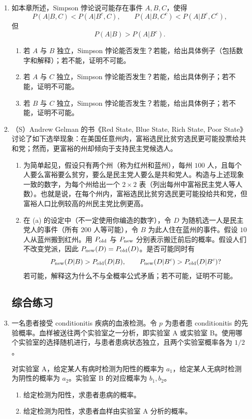 \documentclass[UTF8, 12pt, fontset=fandol, oneside]{ctexart}
\begin{document}
\begin{enumerate}
  \item 如本章所述，Simpson 悖论说可能存在事件 $A,B,C$，使得
  \[
    P(A|B,C)<P(A|B^c,C),\qquad
    P(A|B,C^c)<P(A|B^c,C^c),
  \]
  但
  \[
    P(A|B)>P(A|B^c).
  \]
  \begin{enumerate}
    \item 若 $A$ 与 $B$ 独立，Simpson 悖论能否发生？若能，给出具体例子（包括数字和解释）；若不能，证明不可能。
    \item 若 $A$ 与 $C$ 独立，Simpson 悖论能否发生？若能，给出具体例子；若不能，证明不可能。
    \item 若 $B$ 与 $C$ 独立，Simpson 悖论能否发生？若能，给出具体例子；若不能，证明不可能。
  \end{enumerate}

  \item （S）Andrew Gelman 的书《Red State, Blue State, Rich State, Poor State》讨论了如下选举现象：在美国任意州内，富裕选民比贫穷选民更可能投票给共和党；然而，更富裕的州却倾向于支持民主党候选人。
  \begin{enumerate}
    \item 为简单起见，假设只有两个州（称为红州和蓝州），每州 $100$ 人，且每个人要么富裕要么贫穷，要么是民主党人要么是共和党人。构造与上述现象一致的数字，为每个州给出一个 $2\times 2$ 表（列出每州中富裕民主党人等人数）。也就是说，在每个州内，富裕选民比贫穷选民更可能投给共和党，但富裕人口比例较高的州民主党比例更高。
    \item 在 (a) 的设定中（不一定使用你编造的数字），令 $D$ 为随机选一人是民主党人的事件（所有 $200$ 人等可能），令 $B$ 为此人住在蓝州的事件。假设 $10$ 人从蓝州搬到红州。用 $P_{\rm old}$ 与 $P_{\rm new}$ 分别表示搬迁前后的概率。假设人们不改变党派，因此 $P_{\rm new}(D)=P_{\rm old}(D)$。是否可能同时有
    \[
      P_{\rm new}(D|B)>P_{\rm old}(D|B),\qquad
      P_{\rm new}(D|B^c)>P_{\rm old}(D|B^c)?
    \]
    若可能，解释这为什么不与全概率公式矛盾；若不可能，证明不可能。
  \end{enumerate}

\subsection*{综合练习}

  \item 一名患者接受 conditionitis 疾病的血液检测。令 $p$ 为患者患 conditionitis 的先验概率。血样被送往两个实验室之一分析，即实验室 A 或实验室 B。使用哪个实验室的选择随机进行，与患者患病状态独立，且两个实验室概率各为 $1/2$。

  对实验室 A，给定某人有病时检测为阳性的概率为 $a_1$，给定某人无病时检测为阴性的概率为 $a_2$。实验室 B 的对应概率为 $b_1,b_2$。
  \begin{enumerate}
    \item 给定检测为阳性，求患者患病的概率。
    \item 给定检测为阳性，求患者血样由实验室 A 分析的概率。
  \end{enumerate}


\end{enumerate}
\end{document}
